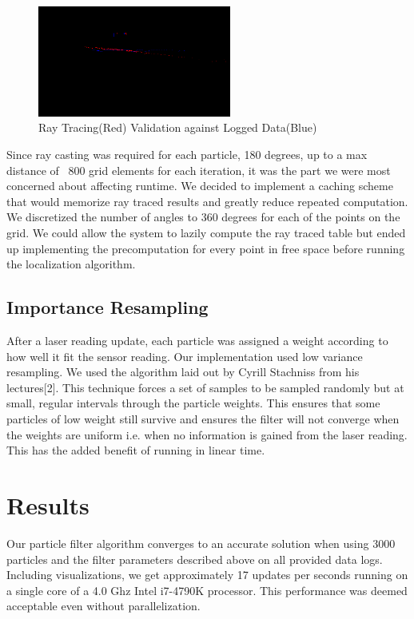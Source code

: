 \documentclass{article}
\begin{document}
\begin{figure}[!h]
    \centering
    \includegraphics[width=2.5in]{media/ray_tracing.png}
    \caption{Ray Tracing(Red) Validation against Logged Data(Blue)}
\label{fig:5}
\end{figure}

Since ray casting was required for each particle, 180 degrees, up to a max distance of ~800 grid elements for each iteration, it was the part we were most concerned about affecting runtime.  We decided to implement a caching scheme that would memorize ray traced results and greatly reduce repeated computation. We discretized the number of angles to 360 degrees for each of the points on the grid. We could allow the system to lazily compute the ray traced table but ended up implementing the precomputation for every point in free space before running the localization algorithm.   

\subsection{Importance Resampling}

After a laser reading update, each particle was assigned a weight according to how well it fit the sensor reading. Our implementation used low variance resampling. We used the algorithm laid out by Cyrill Stachniss from his lectures[2].  This technique forces a set of samples to be sampled randomly but at small, regular intervals through the particle weights. This ensures that some particles of low weight still survive and ensures the filter will not converge when the weights are uniform i.e. when no information is gained from the laser reading.  This has the added benefit of running in linear time.

\section{Results}

Our particle filter algorithm converges to an accurate solution when using 3000 particles and the filter parameters described above on all provided data logs.  Including visualizations, we get approximately 17 updates per seconds running on a single core of a 4.0 Ghz Intel i7-4790K processor. This performance was deemed acceptable even without parallelization.
\end{document}
